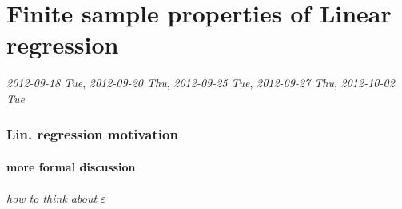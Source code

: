 
\part*{Finite sample properties of Linear regression}%

   \textit{2012-09-18 Tue}, \textit{2012-09-20 Thu}, \textit{2012-09-25 Tue}, 
   \textit{2012-09-27 Thu}, \textit{2012-10-02 Tue}
\section{Lin. regression motivation}
\label{sec-1}
\subsection{more formal discussion}
\label{sec-1-1}
\paragraph{how to think about $\varepsilon$}
\label{sec-1-1-1}

